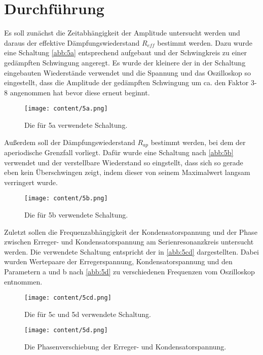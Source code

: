 \section{Durchführung}
\label{sec:Durchführung}
Es soll zunächst die Zeitabhängigkeit der Amplitude untersucht werden und daraus der effektive Dämpfungswiederstand $R_{eff}$ bestimmt werden.
Dazu wurde eine Schaltung \autoref{abb:5a} entsprechend aufgebaut und der Schwingkreis zu einer gedämpften Schwingung angeregt.
Es wurde der kleinere der in der Schaltung eingebauten Wiederstände verwendet und die Spannung und das Oszilloskop so eingestellt,
dass die Amplitude der gedämpften Schwingung um ca. den Faktor 3-8 angenommen hat bevor diese erneut beginnt.
\begin{figure}[H]
    \centering
    \texttt{[image: content/5a.png]}
    \caption{Die für 5a verwendete Schaltung. \cite{sample}}
    \label{abb:5a}
\end{figure}
\noindent Außerdem soll der Dämpfungswiederstand $R_{ap}$ bestimmt werden, bei dem der aperiodische Grenzfall vorliegt.
Dafür wurde eine Schaltung nach \autoref{abb:5b} verwendet und der verstellbare Wiederstand so eingstellt, dass sich
so gerade eben kein Überschwingen zeigt, indem dieser von seinem Maximalwert langsam verringert wurde.
\begin{figure}[H]
    \centering
    \texttt{[image: content/5b.png]}
    \caption{Die für 5b verwendete Schaltung. \cite{sample}}
    \label{abb:5b}
\end{figure}
\noindent Zuletzt sollen die Frequenzabhängigkeit der Kondensatorspannung und der Phase zwischen Erreger- und Kondensatorspannung
am Serienresonanzkreis untersucht werden. Die verwendete Schaltung entspricht der in \autoref{abb:5cd} dargestellten. Dabei wurden
Wertepaare der Erregerspannung, Kondensatorspannung und den Parametern a und b nach \autoref{abb:5d} zu verschiedenen Frequenzen vom Oszilloskop
entnommen.
\begin{figure}[H]
    \centering
    \texttt{[image: content/5cd.png]}
    \caption{Die für 5c und 5d verwendete Schaltung. \cite{sample}}
    \label{abb:5cd}
\end{figure}
\begin{figure}[H]
    \centering
    \texttt{[image: content/5d.png]}
    \caption{Die Phasenverschiebung der Erreger- und Kondensatorspannung. \cite{V353}}
    \label{abb:5d}
\end{figure}
